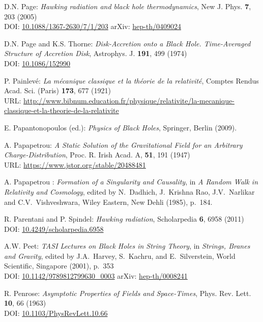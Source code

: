 \begin{thebibliography}{123}
D.N. Page:
{\em Hawking radiation and black hole thermodynamics},
New J. Phys. {\bf 7}, 203 (2005)\\
DOI: \href{https://doi.org/10.1088/1367-2630/7/1/203}{10.1088/1367-2630/7/1/203}\hfill
arXiv: \href{https://arxiv.org/abs/hep-th/0409024}{hep-th/0409024}

D.N. Page and K.S. Thorne:
{\em Disk-Accretion onto a Black Hole. Time-Averaged Structure of Accretion Disk},
Astrophys. J. {\bf 191}, 499 (1974)\\
DOI: \href{https://doi.org/10.1086/152990}{10.1086/152990}

P. Painlevé: \emph{La mécanique classique et la théorie de la relativité},
Comptes Rendus Acad. Sci. (Paris) {\bf 173}, 677 (1921)\\
URL: \url{http://www.bibnum.education.fr/physique/relativite/la-mecanique-classique-et-la-theorie-de-la-relativite}

E. Papantonopoulos (ed.): {\em Physics of Black Holes}, Springer, Berlin (2009).

A. Papapetrou:
{\em A Static Solution of the Gravitational Field for an Arbitrary Charge-Distribution},
Proc. R. Irish Acad. A, {\bf 51}, 191 (1947)\\
URL: \url{https://www.jstor.org/stable/20488481}

A. Papapetrou : {\em Formation of a Singularity and Causality},
in {\em A Random Walk in Relativity and Cosmology},
edited by N.~Dadhich, J.~Krishna Rao, J.V.~Narlikar and C.V.~Vishveshwara,
Wiley Eastern, New Dehli (1985), p.~184.

R. Parentani and P. Spindel:
{\em Hawking radiation},
Scholarpedia {\bf 6}, 6958 (2011)\\
DOI: \href{https://doi.org/10.4249/scholarpedia.6958}{10.4249/scholarpedia.6958}

A.W. Peet:
{\em TASI Lectures on Black Holes in String Theory},
in {\em Strings, Branes and Gravity}, edited by
J.A.~Harvey, S.~Kachru, and E.~Silverstein,
World Scientific, Singapore (2001), p.~353\\
DOI: \href{https://doi.org/10.1142/9789812799630_0003}{10.1142/9789812799630\_0003}\hfill
arXiv: \href{https://arxiv.org/abs/hep-th/0008241}{hep-th/0008241}

R. Penrose: {\em Asymptotic Properties of Fields and Space-Times},
Phys. Rev. Lett. {\bf 10}, 66 (1963)\\
DOI: \href{https://doi.org/10.1103/PhysRevLett.10.66}{10.1103/PhysRevLett.10.66}


\end{thebibliography}
